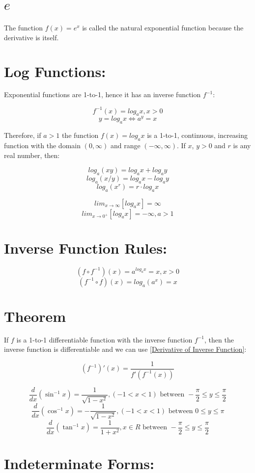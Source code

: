 \documentclass[12pt]{article}
\begin{document}
\section{$e$}
The function $f(x)=e^x$ is called the natural exponential function because the derivative is itself.

\section{Log Functions:} Exponential functions are 1-to-1, hence it has an inverse function $f^{-1}$:

$$f^{-1} (x) = log_a x, x>0$$
$$y=log_a x \iff a^y = x$$

\noindent Therefore, if $a>1$ the function $f(x)=log_a x$ is a 1-to-1, continuous, increasing function with the domain $(0, \infty)$ and range $(-\infty, \infty)$. If $x$, $y>0$ and $r$ is any real number, then:

$$log_a(xy)=log_a x + log_a y$$
$$log_a(x/y)=log_a x - log_a y$$
$$log_a(x^r)=r\cdot log_a x$$

$$lim_{x\to \infty} [log_a x] = \infty$$
$$lim_{x\to 0^+} [log_a x] = -\infty, a > 1$$

\section{Inverse Function Rules:}

$$(f \circ f^{-1})(x) = a^{log_a x} = x, x>0$$
$$(f^{-1} \circ f)(x) = log_a (a^x) = x$$

\section{Theorem} If $f$ is a 1-to-1 differentiable function with the inverse function $f^{-1}$, then the inverse function is differentiable and we can use \ref{Derivative of Inverse Function}: 

$$(f^{-1})'(x) = \frac{1}{f'(f^{-1}(x))}$$

$$\frac{d}{dx} \left( \sin^{-1} x \right) = \frac{1}{\sqrt{1-x^2}}, (-1 < x < 1) \text{ between } -\frac{\pi}{2} \leq y \leq \frac{\pi}{2}$$
$$\frac{d}{dx} \left( \cos^{-1} x \right) = -\frac{1}{\sqrt{1-x^2}}, (-1 < x < 1)  \text{ between } 0 \leq y \leq \pi$$
$$\frac{d}{dx} \left( \tan^{-1} x \right) = \frac{1}{1+x^2}, x \in {\mathbb{} R}\text{ between } -\frac{\pi}{2} \leq y \leq \frac{\pi}{2}$$

\section{Indeterminate Forms:}
\end{document}
